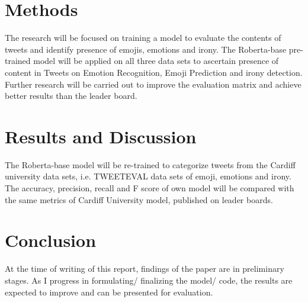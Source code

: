 \documentclass[a4paper]{article}
\begin{document}
\section{Methods}
\quad The research will be focused on training a model to evaluate the contents of tweets and identify presence of emojis, emotions and irony.
The Roberta-base pre-trained model will be applied on all three data sets to ascertain presence of content in Tweets on Emotion Recognition, Emoji Prediction and irony detection. Further research will be carried out to improve the evaluation matrix and achieve better results than the leader board.  
\section{Results and Discussion}
\quad The Roberta-base model will be re-trained to categorize tweets from the Cardiff university data sets, i.e. TWEETEVAL data sets of emoji, emotions and irony. The accuracy, precision, recall and F score of own model will be compared with the same metrics of Cardiff University model, published on leader boards. 
\section{Conclusion}
\quad At the time of writing of this report, findings of the paper are in preliminary stages. As I progress in formulating/ finalizing the model/ code, the results are expected to improve and can be presented for evaluation. 
\cleardoublepage
\end{document}
